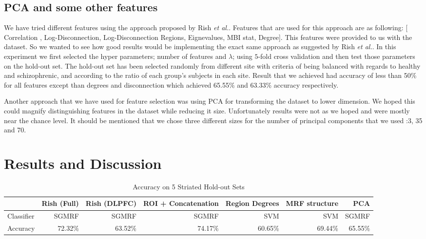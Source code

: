 \documentclass{article} %
\begin{document}
\subsection{PCA and some other features}
We have tried different features using the approach proposed by Rish \emph{et al.}. Features that are used for this approach are as following: [ Correlation , Log-Disconnection, Log-Disconnection Regions, Eignevalues, MBI stat, Degree].
This features were provided to us with the dataset. So we wanted to see how good results would be implementing the exact same approach as suggested by Rish \emph{et al.}. In this experiment we first selected the hyper parameters; number of features and $\lambda$; using $5$-fold cross validation and then test those parameters on the hold-out set. The hold-out set has been selected randomly from different site with criteria of being balanced with regards to healthy and schizophrenic, and according to the ratio of each group's subjects in each site. Result that we achieved had accuracy of less than 50\% for all features except than degrees and disconnection which achieved 65.55\% and 63.33\% accuracy respectively. 

Another approach that we have used for feature selection was using PCA for transforming the dataset to lower dimension. We hoped this could magnify distinguishing features in the dataset while reducing it size. Unfortunately results were not as we hoped and were mostly near the chance level. It should be mentioned that we chose three different sizes for the number of principal components that we used :3, 35 and 70.   


\section{Results and Discussion}

\begin{table}[!htb]\footnotesize
\begin{center}
    \begin{tabular}{| l | r | r | r | r | r | r |}
    \hline
                & Rish (Full) & Rish (DLPFC) & ROI + Concatenation & Region Degrees & MRF structure & PCA     \\ \hline
    Classifier  & SGMRF       & SGMRF        & SGMRF               & SVM            & SVM           & SGMRF   \\ \hline
    Accuracy    & 72.32\%     & 63.52\%      & 74.17\%             & 60.65\%        & 69.44\%       & 65.55\% \\ \hline
    \end{tabular}
    \caption{Accuracy on 5 Striated Hold-out Sets}
     \label{fig:holdout_table}
\end{center}
\end{table}
\end{document}
